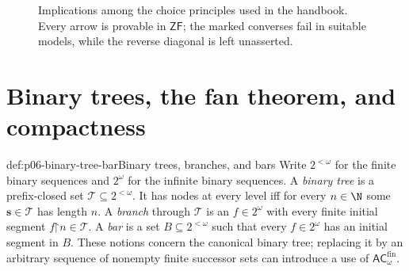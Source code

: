 \begin{figure}[!htbp]
\centering
{}
\caption{Implications among the choice principles used in the handbook.  Every
arrow is provable in \(\mathsf{ZF}\); the marked
  converses fail in suitable models, while the reverse diagonal is left
  unasserted.}
\label{fig:p06-choice-implications}
\end{figure}
\clearpage

\section[Binary-tree compactness]{Binary trees, the fan theorem, and compactness}

\begin{hbdefinition}{def:p06-binary-tree-bar}{Binary trees, branches, and bars}
Write \(2^{<\omega}\) for the finite binary sequences and \(2^\omega\) for
the infinite binary sequences.  A \emph{binary tree} is a prefix-closed set
\(\mathcal T\subseteq2^{<\omega}\).  It has nodes at every level iff for every
\(n\in\N\) some \(\mathbf s\in\mathcal T\) has length \(n\).  A \emph{branch} through
\(\mathcal T\) is an \(f\in2^\omega\) with every finite initial segment
\(f\mathord{\upharpoonright}n\in\mathcal T\).  A \emph{bar} is a set
\(B\subseteq2^{<\omega}\) such that every \(f\in2^\omega\) has an initial
segment in \(B\).  These notions concern the canonical binary tree; replacing
it by an arbitrary sequence of nonempty finite successor sets can introduce a
use of \(\mathsf{AC}_{\omega}^{\mathrm{fin}}\).
\end{hbdefinition}

